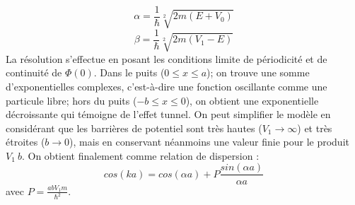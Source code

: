 \begin{equation}
\alpha=\frac{1}{\hbar}\sqrt[2]{2m(E+V_0)}
\end{equation}
\begin{equation}
\beta=\frac{1}{\hbar}\sqrt[2]{2m(V_1-E)}
\end{equation}
La résolution s'effectue en posant les conditions limite de périodicité et de continuité de $\Phi(0)$. Dans le puits ($0\leq x \leq a$); on trouve une somme d'exponentielles complexes, c'est-à-dire une fonction oscillante comme une particule libre; hors du puits ($-b\leq x\leq 0$), on obtient une exponentielle décroissante qui témoigne de l'effet tunnel.
On peut simplifier le modèle en considérant que les barrières de potentiel sont très hautes ($V_1 \rightarrow \infty$) et très étroites ($b\rightarrow 0$), mais en conservant néanmoins une valeur finie pour le produit $V_1~b$. On obtient finalement comme relation de dispersion :%
\begin{equation}
cos(ka)=cos(\alpha a)+P \frac{sin(\alpha a)}{\alpha a}
\end{equation}
avec $P=\frac{abV_1m}{\hbar^2} $.

